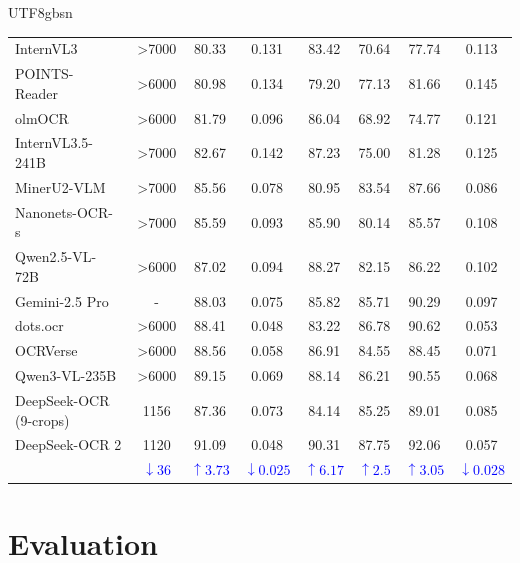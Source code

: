 \documentclass[11pt, a4paper, logo, copyright, nonumbering]{deepseek}
\begin{document}
\begin{CJK*}{UTF8}{gbsn}
\begin{table}[h]
{\begin{tabular}{l|c|c|ccccc}
InternVL3~\cite{zhu2025internvl3}& >7000 & 80.33 & 0.131 & 83.42 & 70.64 & 77.74  & 0.113 \\
POINTS-Reader~\cite{liu2025pointsreader} & >6000 & 80.98 & 0.134 & 79.20 & 77.13 & 81.66 & 0.145 \\
olmOCR~\cite{poznanski2025olmocr} & >6000 & 81.79 & 0.096 & 86.04 & 68.92 & 74.77 & 0.121 \\
InternVL3.5-241B~\cite{wang2025internvl35}& >7000 & 82.67 & 0.142 & 87.23 & 75.00 & 81.28  & 0.125 \\
MinerU2-VLM~\cite{wang2024mineru}& >7000 & 85.56 & 0.078 & 80.95 & 83.54 & 87.66  & 0.086 \\
Nanonets-OCR-s~\cite{NanonetsOCRs}& >7000 & 85.59 & 0.093 & 85.90 & 80.14 & 85.57  & 0.108 \\
Qwen2.5-VL-72B~\cite{Qwen2.5-VL} & >6000 & 87.02 & 0.094 & 88.27 & 82.15 & 86.22 & 0.102 \\
Gemini-2.5 Pro\cite{google_gemini_web} & - & 88.03 & 0.075 & 85.82 & 85.71 & 90.29 & 0.097 \\
dots.ocr~\cite{dots} & >6000 & 88.41 & 0.048 & 83.22 & 86.78 & 90.62 & 0.053 \\ 
OCRVerse~\cite{OCRVerse} & >6000 & 88.56 & 0.058 & 86.91 & 84.55 & 88.45 & 0.071 \\ 
Qwen3-VL-235B~\cite{bai2025qwen3vltechnicalreport} & >6000 & 89.15 & 0.069 & 88.14 & 86.21 & 90.55 & 0.068 \\ 
\midrule 
DeepSeek-OCR (9-crops) & 1156 & 87.36 & 0.073 & 84.14 & 85.25 & 89.01 & 0.085 \\ 
DeepSeek-OCR 2 & 1120 & 91.09  & 0.048  & 90.31  & 87.75  & 92.06 &  0.057 \\ 

 &  \textcolor{blue}{$\downarrow 36$} &\textcolor{blue}{$\uparrow 3.73$} & \textcolor{blue}{$\downarrow 0.025$} & \textcolor{blue}{$\uparrow 6.17$} & \textcolor{blue}{$\uparrow 2.5$} & \textcolor{blue}{$\uparrow 3.05$} &\textcolor{blue}{$\downarrow 0.028$}\\
\bottomrule[.9pt]
\end{tabular}
}
\end{table}


\section{Evaluation}


\end{CJK*}
\end{document}
